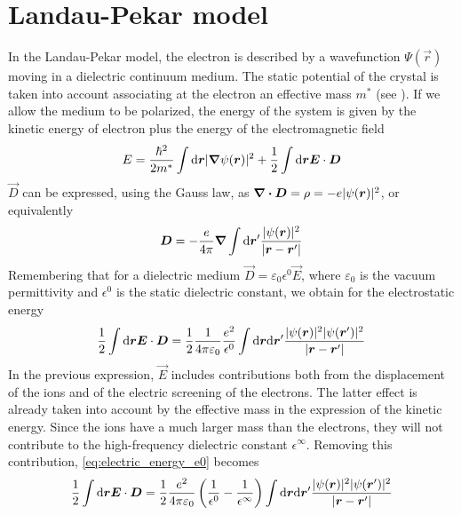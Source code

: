 \section{Landau-Pekar model} \label{sec:landau_pekar}
In the Landau-Pekar model, the electron is described by a wavefunction $\Psi(\vec{r})$ moving in a dielectric continuum medium. The static potential of the crystal is taken into account associating at the electron an effective mass $m^*$ (see ). If we allow the medium to be polarized, the energy of the system is given by the kinetic energy of electron plus the energy of the electromagnetic field
\begin{equation} \label{eq:energy_landau}
    E = \frac{\hbar^2}{2m^*} \int \differential\vec{r} |\grad \psi(\vec{r})|^2 + \oh \int \differential \vec{r} \vec{E}\cdot \vec{D}
\end{equation}
$\vec{D}$ can be expressed, using the Gauss law, as $\div\mathbf{\boldsymbol{D}} = \rho = -e |\psi(\mathbf{\boldsymbol{r}})|^2$, or equivalently
\begin{equation}
    \vec{D} = -\frac{e}{4\pi} \grad \int \differential \vec{r}' \frac{|\psi(\vec{r})|^2}{|\vec{r}-\vec{r}'|}
\end{equation}
Remembering that for a dielectric medium $\vec{D} = \varepsilon_0 \epsilon^0 \vec{E}$, where $\varepsilon_0$ is the vacuum permittivity and $\epsilon^0$ is the static dielectric constant, we obtain for the electrostatic energy
\begin{equation} \label{eq:electric_energy_e0}
    \oh \int \differential \vec{r}  \vec{E}\cdot \vec{D} =
    \oh \frac{1}{4\pi\varepsilon_0} \frac{e^2}{\epsilon^0} \int \differential \vec{r} \differential \vec{r}' \frac{|\psi(\vec{r})|^2|\psi(\vec{r}')|^2}{|\vec{r}-\vec{r}'|}
\end{equation}
In the previous expression, $\vec{E}$ includes contributions both from the displacement of the ions and of the electric screening of the electrons. The latter effect is already taken into account by the effective mass in the expression of the kinetic energy. Since the ions have a much larger mass than the electrons, they will not contribute to the high-frequency dielectric constant $\epsilon^\infty$. Removing this contribution, \cref{eq:electric_energy_e0} becomes
\begin{equation}
    \oh \int \differential \vec{r} \vec{E}\cdot \vec{D} =
    \oh \frac{e^2}{4\pi\varepsilon_0} \left( \frac{1}{\epsilon^0} - \frac{1}{\epsilon^\infty} \right) \int \differential \vec{r} \differential \vec{r}' \frac{|\psi(\vec{r})|^2|\psi(\vec{r}')|^2}{|\vec{r}-\vec{r}'|}
\end{equation}
